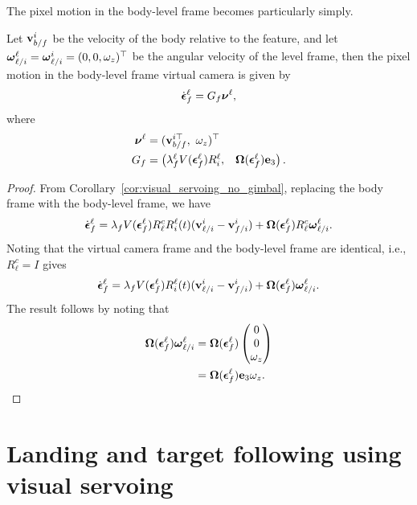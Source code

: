 The pixel motion in the body-level frame becomes particularly simply.
\begin{lemma} \label{lem:visual_servoing_multirotor}
	Let $\mathbf{v}_{b/f}^i$ be the velocity of the body relative to the feature, and let $\boldsymbol{\omega}_{\ell/i}^\ell =\boldsymbol{\omega}_{\ell/i}^i = (0, 0, \omega_z)^\top$ be the angular velocity of the level frame,
	then the pixel motion in the body-level frame virtual camera is given by
	\[
	\dot{\boldsymbol{\epsilon}}_f^\ell = G_f \boldsymbol{\nu}^\ell,
	\]
	where
	\begin{align*}
	\boldsymbol{\nu}^\ell &= (\mathbf{v}_{b/f}^{i\top}, ~\omega_z)^\top \\
	G_f &= \begin{pmatrix}
			\lambda_f^\ell V(\boldsymbol{\epsilon}_f^\ell) R_i^\ell, & \boldsymbol{\Omega}(\boldsymbol{\epsilon}_f^\ell)\mathbf{e}_3
		   \end{pmatrix}.
	\end{align*}
	
\end{lemma}
\begin{proof}
	From Corollary~\ref{cor:visual_servoing_no_gimbal}, replacing the body frame with the body-level frame, we have
		\[
		\dot{\boldsymbol{\epsilon}}_f^\ell = \lambda_f V(\boldsymbol{\epsilon}_f^\ell)R_\ell^c R_i^\ell(t)(\mathbf{v}_{\ell/i}^i - \mathbf{v}_{f/i}^i) + \boldsymbol{\Omega}(\boldsymbol{\epsilon}_f^\ell) R_\ell^c \boldsymbol{\omega}_{\ell/i}^\ell.
		\]
		Noting that the virtual camera frame and the body-level frame are identical, i.e., $R_\ell^c=I$ gives
		\[
		\dot{\boldsymbol{\epsilon}}_f^\ell = \lambda_f V(\boldsymbol{\epsilon}_f^\ell) R_i^\ell(t)(\mathbf{v}_{\ell/i}^i - \mathbf{v}_{f/i}^i) + \boldsymbol{\Omega}(\boldsymbol{\epsilon}_f^\ell) \boldsymbol{\omega}_{\ell/i}^\ell.
		\]
		The result follows by noting that 
		\begin{align*}
		\boldsymbol{\Omega}(\boldsymbol{\epsilon}_f^\ell) \boldsymbol{\omega}_{\ell/i}^\ell 
			&= \boldsymbol{\Omega}(\boldsymbol{\epsilon}_f^\ell) \begin{pmatrix} 0 \\ 0 \\ \omega_z \end{pmatrix} \\
			&= \boldsymbol{\Omega}(\boldsymbol{\epsilon}_f^\ell)\mathbf{e}_3 \omega_z.
		\end{align*}		
\end{proof}

\section{Landing and target following using visual servoing}

